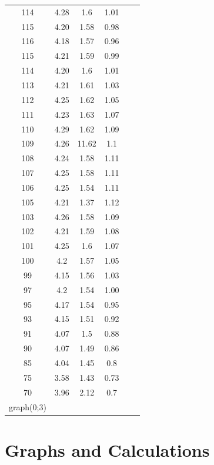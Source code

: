 \documentclass[a4paper]{article}
\begin{document}
\begin{table}[htb]
\begin{tabular}{@{}cccccc@{}}
        114 & 4.28 & 1.6 & 1.01 &  &  \\
        115 & 4.20 & 1.58 & 0.98 &  &  \\
        116 & 4.18 & 1.57 & 0.96 &  &  \\
        115 & 4.21 & 1.59 & 0.99 &  &  \\
        114 & 4.20 & 1.6 & 1.01 &  &  \\
        113 & 4.21 & 1.61 & 1.03 &  &  \\
        112 & 4.25 & 1.62 & 1.05 &  &  \\
        111 & 4.23 & 1.63 & 1.07 &  &  \\
        110 & 4.29 & 1.62 & 1.09 &  &  \\
        109 & 4.26 & 11.62 & 1.1 &  &  \\
        108 & 4.24 & 1.58 & 1.11 &  &  \\
        107 & 4.25 & 1.58 & 1.11 &  &  \\
        106 & 4.25 & 1.54 & 1.11 &  &  \\
        105 & 4.21 & 1.37 & 1.12 &  &  \\
        103 & 4.26 & 1.58 & 1.09 &  &  \\
        102 & 4.21 & 1.59 & 1.08 &  &  \\
        101 & 4.25 & 1.6 & 1.07 &  &  \\
        100 & 4.2 & 1.57 & 1.05 &  &  \\
        99 & 4.15 & 1.56 & 1.03 &  &  \\
        97 & 4.2 & 1.54 & 1.00 &  &  \\
        95 & 4.17 & 1.54 & 0.95 &  &  \\
        93 & 4.15 & 1.51 & 0.92 &  &  \\
        91 & 4.07 & 1.5 & 0.88 &  &  \\
        90 & 4.07 & 1.49 & 0.86 &  &  \\
        85 & 4.04 & 1.45 & 0.8 &  &  \\
        75 & 3.58 & 1.43 & 0.73 &  &  \\
        70 & 3.96 & 2.12 & 0.7 &  &  \\
        graph(0;3) &  &  &  &  &  \\
        \bottomrule
    \end{tabular}
\end{table}

\section*{Graphs and Calculations}
\end{document}
